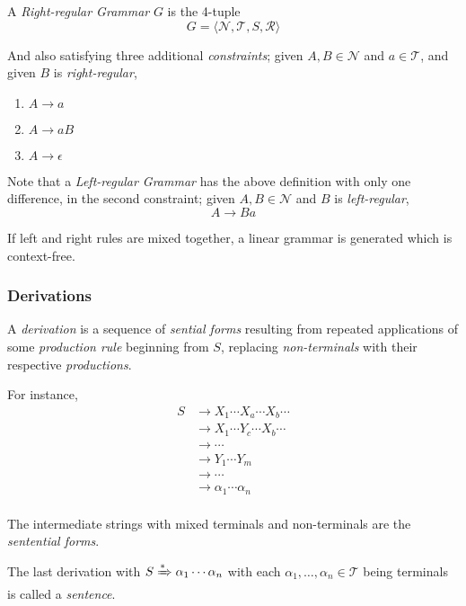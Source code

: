\begin{definition}
    A \textit{Right-regular Grammar} $G$ is the 4-tuple
    \begin{equation}
        G = \langle
            \mathcal{N},
            \mathcal{T},
            S,
            \mathcal{R}
        \rangle
    \end{equation}
    
    And also satisfying three additional \textit{constraints}; given $A, B \in \mathcal{N}$ and $a \in \mathcal{T}$, and given $B$ is \textit{right-regular},
    \begin{enumerate}
        \item $A \to a$
        \item $A \to aB$
        \item $A \to \epsilon$
    \end{enumerate}
\end{definition}

\begin{remark}
    Note that a \textit{Left-regular Grammar} has the above definition with only one difference, in the second constraint; given $A, B \in \mathcal{N}$ and $B$ is \textit{left-regular},
    \begin{equation}
        A \to Ba
    \end{equation}

    If left and right rules are mixed together, a linear grammar is generated which is context-free.
\end{remark}

\subsubsection{Derivations}

\begin{definition}[Derivation]
    A \textit{derivation} is a sequence of \textit{sential forms} resulting from repeated applications of some \textit{production rule} beginning from $S$, replacing \textit{non-terminals} with their respective \textit{productions}.
\end{definition}

\begin{example}
    For instance,
    \begin{align*}
        S &\to X_1 \cdots X_a \cdots X_b \cdots \\
          &\to X_1 \cdots Y_c \cdots X_b \cdots \\
          &\to \cdots \\
          &\to Y_1 \cdots Y_m \\
          &\to \cdots \\
          &\to \alpha_1 \cdots \alpha_n \\
    \end{align*}
    
    The intermediate strings with mixed terminals and non-terminals are the \textit{sentential forms}.
    
    The last derivation with $S \xRightarrow{\ast} \alpha_1 \cdots \alpha_n$ with each $\alpha_1, \dots, \alpha_n \in \mathcal{T}$ being terminals is called a \textit{sentence}.
\end{example}

